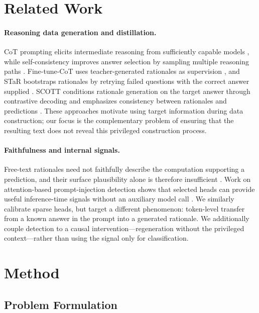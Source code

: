 \documentclass[11pt]{article}
\begin{document}
\section{Related Work}

\paragraph{Reasoning data generation and distillation.}
CoT prompting elicits intermediate reasoning from sufficiently capable models
\citep{wei2022chain}, while self-consistency improves answer selection by
sampling multiple reasoning paths \citep{wang2023selfconsistency}.  Fine-tune-CoT
uses teacher-generated rationales as supervision \citep{ho2023reasoningteacher},
and STaR bootstraps rationales by retrying failed questions with the correct
answer supplied \citep{zelikman2022star}.  SCOTT conditions rationale generation
on the target answer through contrastive decoding and emphasizes consistency
between rationales and predictions \citep{wang2023scott}.  These approaches
motivate using target information during data construction; our focus is the
complementary problem of ensuring that the resulting text does not reveal this
privileged construction process.

\paragraph{Faithfulness and internal signals.}
Free-text rationales need not faithfully describe the computation supporting a
prediction, and their surface plausibility alone is therefore insufficient
\citep{jacovi2020faithfulness}.  Work on attention-based prompt-injection
detection shows that selected heads can provide useful inference-time signals
without an auxiliary model call \citep{hung2024attentiontracker}.  We similarly
calibrate sparse heads, but target a different phenomenon: token-level transfer
from a known answer in the prompt into a generated rationale.  We additionally
couple detection to a causal intervention---regeneration without the privileged
context---rather than using the signal only for classification.

\section{Method}
\label{sec:method}

\subsection{Problem Formulation}
\end{document}
